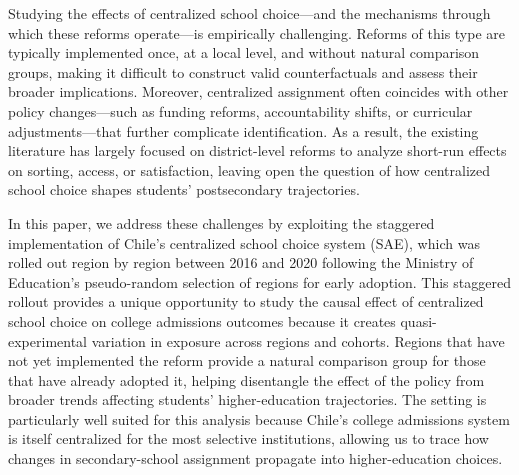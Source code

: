 
Studying the effects of centralized school choice---and the mechanisms through which these reforms operate---is empirically challenging. Reforms of this type are typically implemented once, at a local level, and without natural comparison groups, making it difficult to construct valid counterfactuals and assess their broader implications. Moreover, centralized assignment often coincides with other policy changes---such as funding reforms, accountability shifts, or curricular adjustments---that further complicate identification.  As a result, the existing literature has largely focused on district-level reforms to analyze short-run effects on sorting, access, or satisfaction, leaving open the question of how centralized school choice shapes students' postsecondary trajectories.

In this paper, we address these challenges by exploiting the staggered implementation of Chile's centralized school choice system (SAE), which was rolled out region by region between 2016 and 2020 following the Ministry of Education’s pseudo-random selection of regions for early adoption. 
This staggered rollout provides a unique opportunity to study the causal effect of centralized school choice on college admissions outcomes because it creates quasi-experimental variation in exposure across regions and cohorts. Regions that have not yet implemented the reform provide a natural comparison group for those that have already adopted it, helping disentangle the effect of the policy from broader trends affecting students' higher-education trajectories.
The setting is particularly well suited for this analysis because Chile's college admissions system is itself centralized for the most selective institutions, allowing us to trace how changes in secondary-school assignment propagate into higher-education choices.

